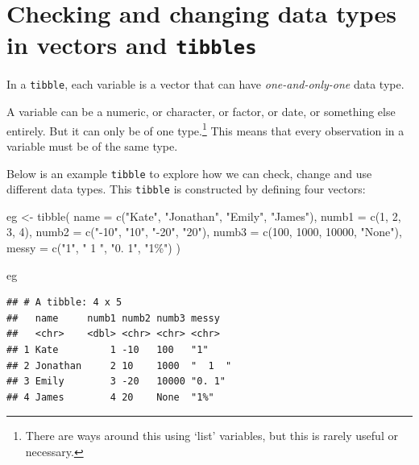 \documentclass[
]{book}
\newenvironment{Shaded}{\begin{snugshade}}{\end{snugshade}}
\newcommand{\AttributeTok}[1]{\textcolor[rgb]{0.77,0.63,0.00}{#1}}
\newcommand{\DecValTok}[1]{\textcolor[rgb]{0.00,0.00,0.81}{#1}}
\newcommand{\FunctionTok}[1]{\textcolor[rgb]{0.00,0.00,0.00}{#1}}
\newcommand{\NormalTok}[1]{#1}
\newcommand{\OtherTok}[1]{\textcolor[rgb]{0.56,0.35,0.01}{#1}}
\newcommand{\StringTok}[1]{\textcolor[rgb]{0.31,0.60,0.02}{#1}}
\begin{document}
\hypertarget{checking-and-changing-data-types-in-vectors-and-tibbles}{%
\section{\texorpdfstring{Checking and changing data types in vectors and \texttt{tibbles}}{Checking and changing data types in vectors and tibbles}}\label{checking-and-changing-data-types-in-vectors-and-tibbles}}

In a \texttt{tibble}, each variable is a vector that can have \emph{one-and-only-one} data type.

A variable can be a numeric, or character, or factor, or date, or something else entirely.
But it can only be of one type.\footnote{There are ways around this using `list' variables, but this is rarely useful or necessary.}
This means that every observation in a variable must be of the same type.

Below is an example \texttt{tibble} to explore how we can check, change and use different data types.
This \texttt{tibble} is constructed by defining four vectors:

\begin{Shaded}
\begin{Highlighting}[]
\NormalTok{eg }\OtherTok{\textless{}{-}} \FunctionTok{tibble}\NormalTok{(}
  \AttributeTok{name =} \FunctionTok{c}\NormalTok{(}\StringTok{"Kate"}\NormalTok{, }\StringTok{"Jonathan"}\NormalTok{, }\StringTok{"Emily"}\NormalTok{, }\StringTok{"James"}\NormalTok{),}
  \AttributeTok{numb1 =} \FunctionTok{c}\NormalTok{(}\DecValTok{1}\NormalTok{, }\DecValTok{2}\NormalTok{, }\DecValTok{3}\NormalTok{, }\DecValTok{4}\NormalTok{),}
  \AttributeTok{numb2 =} \FunctionTok{c}\NormalTok{(}\StringTok{"{-}10"}\NormalTok{, }\StringTok{"10"}\NormalTok{, }\StringTok{"{-}20"}\NormalTok{, }\StringTok{"20"}\NormalTok{),}
  \AttributeTok{numb3 =} \FunctionTok{c}\NormalTok{(}\DecValTok{100}\NormalTok{, }\DecValTok{1000}\NormalTok{, }\DecValTok{10000}\NormalTok{, }\StringTok{"None"}\NormalTok{),}
  \AttributeTok{messy =} \FunctionTok{c}\NormalTok{(}\StringTok{"1"}\NormalTok{, }\StringTok{"  1  "}\NormalTok{, }\StringTok{"0. 1"}\NormalTok{, }\StringTok{"1\%"}\NormalTok{)}
\NormalTok{)}

\NormalTok{eg}
\end{Highlighting}
\end{Shaded}

\begin{verbatim}
## # A tibble: 4 x 5
##   name     numb1 numb2 numb3 messy  
##   <chr>    <dbl> <chr> <chr> <chr>  
## 1 Kate         1 -10   100   "1"    
## 2 Jonathan     2 10    1000  "  1  "
## 3 Emily        3 -20   10000 "0. 1" 
## 4 James        4 20    None  "1%"
\end{verbatim}
\end{document}
